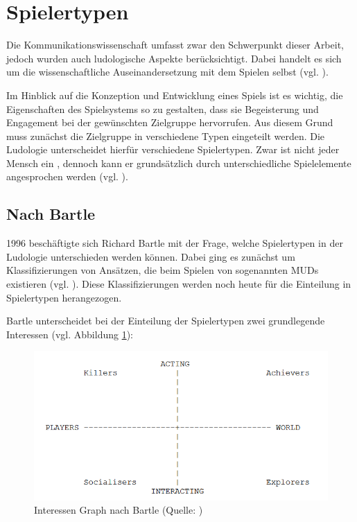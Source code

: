 \section{Spielertypen}
Die Kommunikationswissenschaft umfasst zwar den Schwerpunkt dieser Arbeit, jedoch wurden auch ludologische Aspekte berücksichtigt. Dabei handelt es sich um die wissenschaftliche Auseinandersetzung mit dem Spielen selbst (vgl. \cite{ludologie_spielforschung_nodate}). 

Im Hinblick auf die Konzeption und Entwicklung eines Spiels ist es wichtig, die Eigenschaften des Spielsystems so zu gestalten, dass sie Begeisterung und Engagement bei der gewünschten Zielgruppe hervorrufen. Aus diesem Grund muss zunächst die Zielgruppe in verschiedene Typen eingeteilt werden. Die Ludologie unterscheidet hierfür verschiedene Spielertypen. Zwar ist nicht jeder Mensch ein , dennoch kann er grundsätzlich durch unterschiedliche Spielelemente angesprochen werden (vgl. \cite{ludologie_spielertypen_nodate}).

\subsection{Nach Bartle}
1996 beschäftigte sich Richard Bartle mit der Frage, welche Spielertypen in der Ludologie unterschieden werden können. Dabei ging es zunächst um Klassifizierungen von Ansätzen, die beim Spielen von sogenannten \ac{MUD}s existieren (vgl. \cite{bartle_hearts_1996}). Diese Klassifizierungen werden noch heute für die Einteilung in Spielertypen herangezogen.

Bartle unterscheidet bei der Einteilung der Spielertypen zwei grundlegende Interessen (vgl. Abbildung \ref{fig:bartle-muds}):

\begin{figure}[ht]
\centering
\includegraphics[width=1\linewidth]{content/pictures/basic_interests.PNG}
\caption{Interessen Graph nach Bartle (Quelle: \cite{bartle_hearts_1996})}
\label{fig:bartle-muds}
\end{figure}

